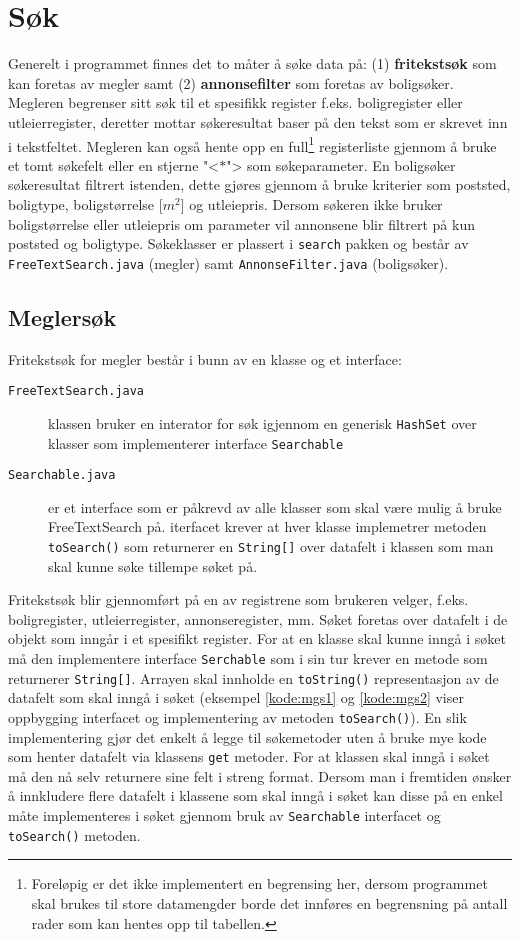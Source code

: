 \section{Søk} \label{sec:sok}
Generelt i programmet finnes det to måter å søke data på: (1) \textbf{fritekstsøk} som kan foretas av megler samt (2) \textbf{annonsefilter} som foretas av boligsøker. Megleren begrenser sitt søk til et spesifikk register f.eks. boligregister eller utleierregister, deretter mottar søkeresultat baser på den tekst som er skrevet inn i tekstfeltet. Megleren kan også hente opp en full\footnote{Foreløpig er det ikke implementert en begrensing her, dersom programmet skal brukes til store datamengder borde det innføres en begrensning på antall rader som kan hentes opp til tabellen.} registerliste gjennom å bruke et tomt søkefelt eller en stjerne "<$\ast$"> som søkeparameter. 
En boligsøker søkeresultat filtrert istenden, dette gjøres gjennom å bruke kriterier som poststed, boligtype, boligstørrelse [$m^2$] og utleiepris. Dersom søkeren ikke bruker boligstørrelse eller utleiepris om parameter vil annonsene blir filtrert på kun poststed og boligtype.
Søkeklasser er plassert i \texttt{search} pakken og består av \texttt{FreeTextSearch.java} (megler) samt \texttt{AnnonseFilter.java} (boligsøker).

\subsection{Meglersøk} \label{subsec:sok:megler}
Fritekstsøk for megler består i bunn av en klasse og et interface:
\begin{description}
\item[\texttt{FreeTextSearch.java}] klassen bruker en interator for søk igjennom en generisk \texttt{HashSet} over klasser som implementerer interface \texttt{Searchable}
\item[\texttt{Searchable.java}] er et interface som er påkrevd av alle klasser som skal være mulig å bruke FreeTextSearch på. iterfacet krever at hver klasse implemetrer metoden \texttt{toSearch()} som returnerer en \texttt{String[]} over datafelt i klassen som man skal kunne søke tillempe søket på.
\end{description}

Fritekstsøk blir gjennomført på en av registrene som brukeren velger, f.eks. boligregister, utleierregister, annonseregister, mm. Søket foretas over datafelt i de objekt som inngår i et spesifikt register. For at en klasse skal kunne inngå i søket må den implementere interface \texttt{Serchable} som i sin tur krever en metode som returnerer \texttt{String[]}. Arrayen skal innholde en \texttt{toString()} representasjon av de datafelt som skal inngå i søket (eksempel \ref{kode:mgs1} og \ref{kode:mgs2} viser oppbygging interfacet og implementering av metoden \texttt{toSearch()}). 
En slik implementering gjør det enkelt å legge til søkemetoder uten å bruke mye kode som henter datafelt via klassens \texttt{get} metoder. For at klassen skal inngå i søket må den nå selv returnere sine felt i streng format.
Dersom man i fremtiden ønsker å innkludere flere datafelt i klassene som skal inngå i søket kan disse på en enkel måte implementeres i søket gjennom bruk av \texttt{Searchable} interfacet og \texttt{toSearch()} metoden.

